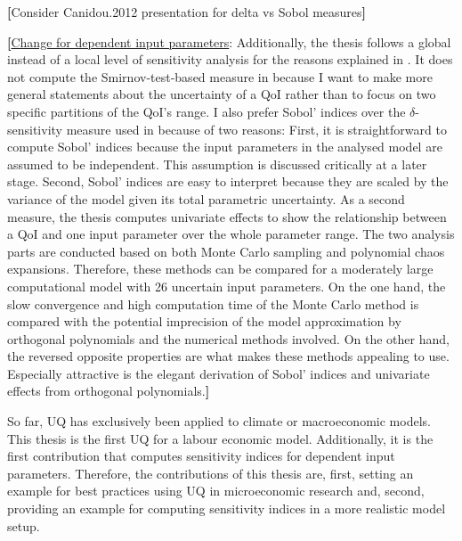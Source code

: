 \textsc{\LARGE \bf [}Consider Canidou.2012 presentation for delta vs Sobol measures\textsc{\LARGE \bf ]}

\textsc{\LARGE \bf [}\uline{Change for dependent input parameters}: Additionally, the thesis follows a global instead of a local level of sensitivity analysis for the reasons explained in \cite{Harenberg.2019}. It does not compute the Smirnov-test-based measure in \cite{Ratto.2008} because I want to make more general statements about the uncertainty of a QoI rather than to focus on two specific partitions of the QoI's range. I also prefer Sobol' indices over the $\delta$-sensitivity measure used in \cite{Anderson.2014} because of two reasons:  First, it is straightforward to compute Sobol' indices because the input parameters in the analysed model are assumed to be independent. This assumption is discussed critically at a later stage. Second, Sobol' indices are easy to interpret because they are scaled by the variance of the model given its total parametric uncertainty. As a second measure, the thesis computes univariate effects to show the relationship between a QoI and one input parameter over the whole parameter range.
The two analysis parts are conducted based on both Monte Carlo sampling and polynomial chaos expansions. Therefore, these methods can be compared for a moderately large computational model with 26 uncertain input parameters. On the one hand, the slow convergence and high computation time of the Monte Carlo method is compared with the potential imprecision of the model approximation by orthogonal polynomials and the numerical methods involved. On the other hand, the reversed opposite properties are what makes these methods appealing to use. Especially attractive is the elegant derivation of Sobol' indices and univariate effects from orthogonal polynomials.\textsc{\LARGE \bf ]}

So far, UQ has exclusively been applied to climate or macroeconomic models. This thesis is the first UQ for a labour economic model. Additionally, it is the first contribution that computes sensitivity indices for dependent input parameters. Therefore, the contributions of this thesis are, first, setting an example for best practices using UQ in microeconomic research and, second, providing an example for computing sensitivity indices in a more realistic model setup.